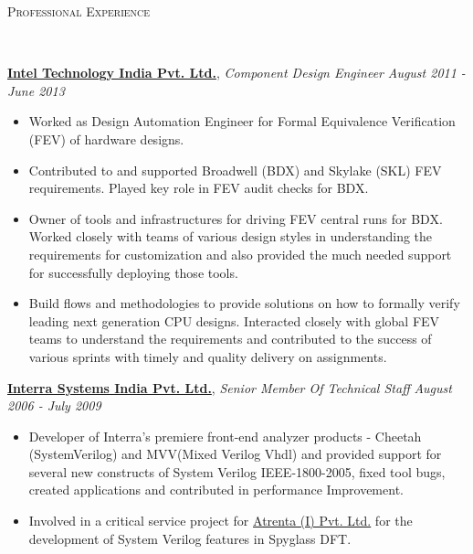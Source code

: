 \documentclass[9pt]{article}
\newenvironment{changemargin}[2]{%
  \begin{list}{}{%
    \setlength{\topsep}{0pt}%
    \setlength{\leftmargin}{#1}%
    \setlength{\rightmargin}{#2}%
    \setlength{\listparindent}{\parindent}%
    \setlength{\itemindent}{\parindent}%
    \setlength{\parsep}{\parskip}%
  }%
  \item[]}{\end{list}
}
\newcommand{\lineover}{
	\begin{changemargin}{-0.05in}{-0.05in}
		\vspace*{-8pt}
		\hrulefill \\
		\vspace*{-2pt}
	\end{changemargin}
}
\newcommand{\header}[1]{
	\begin{changemargin}{-0.5in}{-0.5in}
		\scshape{#1}\\
  	\lineover
	\end{changemargin}
}
\newenvironment{body} {
	\vspace*{-16pt}
	\begin{changemargin}{-0.25in}{-0.5in}
  }	
	{\end{changemargin}
}
\begin{document}
\header{Professional Experience}

\begin{body}
	\vspace{14pt}
	\href{http://www.intel.in/content/www/in/en/homepage.html}{\textbf{Intel Technology India Pvt. Ltd.}}, \emph{Component Design Engineer} \hfill \emph{August 2011 - June 2013}\\
	\vspace*{-4pt}
	\begin{itemize} \itemsep -0pt  %
                \item Worked as Design Automation Engineer for Formal Equivalence Verification (FEV) of hardware designs.
                \item Contributed to and supported Broadwell (BDX) and Skylake (SKL) FEV requirements. Played key role in FEV audit checks for BDX. 
                \item Owner of tools and infrastructures for driving
                FEV central runs for  BDX. Worked closely with teams of various
                design styles in understanding the requirements for
                customization and also provided the much needed support for
                successfully deploying those tools.
                \item Build flows and methodologies to provide solutions on how
                to formally verify leading next generation CPU designs.
                Interacted closely with global FEV teams to understand the
                requirements and contributed to the success of various
                sprints with timely and quality delivery on assignments.
                \end{itemize}

	\href{http://www.interrasystems.com/}{\textbf {Interra Systems India Pvt. Ltd.}}, \emph{Senior Member Of Technical Staff} \hfill \emph{August 2006 - July 2009}\\
	\vspace*{-4pt}
	\begin{itemize} \itemsep -0pt
		\item Developer of Interra's premiere front-end analyzer products - Cheetah (SystemVerilog) and MVV(Mixed Verilog Vhdl) and 
		provided support for several new constructs of System Verilog IEEE-1800-2005, fixed tool bugs, created applications and contributed in performance Improvement. 		
		\item Involved in a critical service project for \href{http://www.atrenta.com/}{Atrenta (I) Pvt. Ltd.} for the development of System Verilog features in Spyglass DFT.
	\end{itemize}
\end{body}
\end{document}
